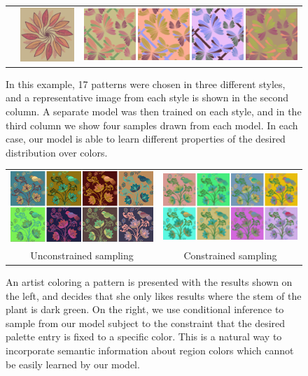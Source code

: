 \begin{figure}[ht]
\begin{tabular}{ccc}
\raisebox{1.55em}{\emph{Mellow}}&\includegraphics[width=.148\columnwidth]{figs/styleResultsMellowExample}&\includegraphics[width=.62\columnwidth]{figs/styleResultsMellow}\vspace{0.5em}\\
\end{tabular}

\caption{In this example, 17 patterns were chosen in three different styles, and a representative image from each style is shown in the second column. A separate model was then trained on each style, and in the third column we show four samples drawn from each model. In each case, our model is able to learn different properties of the desired distribution over colors.}
\label{fig:styleTraining}
\vspace{-1.0em}
\end{figure}

\begin{figure}[ht]
\begin{tabular}{cc} 
\includegraphics[width=.475\linewidth]{figs/constrainedSearchUnconstrained}&\includegraphics[width=.475\linewidth]{figs/constrainedSearchConstrained}\\
Unconstrained sampling&Constrained sampling\\
\end{tabular}

\caption{An artist coloring a pattern is presented with the results shown on the left, and decides that she only likes results where the stem of the plant is dark green. On the right, we use conditional inference to sample from our model subject to the constraint that the desired palette entry is fixed to a specific color. This is a natural way to incorporate semantic information about region colors which cannot be easily learned by our model.}
\label{fig:constrainedInference}
\vspace{-1.0em}
\end{figure}

